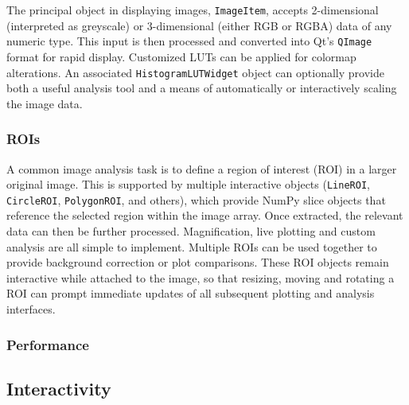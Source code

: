 \documentclass[journal]{vgtc}                %
\begin{document}
The principal object in displaying images, \texttt{ImageItem}, accepts 2-dimensional (interpreted as greyscale) or 3-dimensional (either RGB or RGBA) data of any numeric type. This input is then processed and converted into Qt's \texttt{QImage} format for rapid display. Customized LUTs can be applied for colormap alterations. An associated \texttt{HistogramLUTWidget} object can optionally provide both a useful analysis tool and a means of automatically or interactively scaling the image data.

\subsubsection{ROIs}
A common image analysis task is to define a region of interest (ROI) in a larger original image. This is supported by multiple interactive objects (\texttt{LineROI}, \texttt{CircleROI}, \texttt{PolygonROI}, and others), which provide NumPy slice objects that reference the selected region within the image array. Once extracted, the relevant data can then be further processed. Magnification, live plotting and custom analysis are all simple to implement. Multiple ROIs can be used together to provide background correction or plot comparisons. These ROI objects remain interactive while attached to the image, so that resizing, moving and rotating a ROI can prompt immediate updates of all subsequent plotting and analysis interfaces.

\color{Black}
\subsubsection{Performance}





\subsection{Interactivity}
\end{document}
